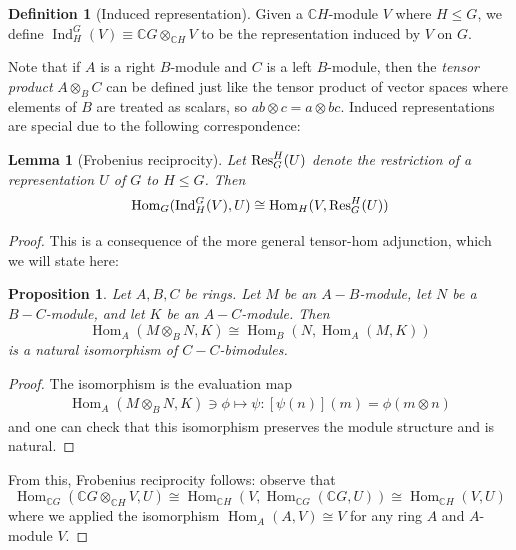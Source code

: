 \documentclass[11pt]{article}
\newtheorem{prop}{Proposition}
\newtheorem{lem}{Lemma}
\theoremstyle{definition}
\newtheorem{defn}{Definition}
\newcommand{\C}{\mathbb C}
\newcommand{\Ind}{\operatorname{Ind}}
\newcommand{\Hom}{\operatorname{Hom}}
\begin{document}
\begin{defn}[Induced representation]
    Given a $\C H$-module $V$ where $H \leq G$, we define $\Ind_H^G(V) \equiv \C
    G \otimes_{\C H} V$ to be the representation induced by $V$ on $G$.
\end{defn}

Note that if $A$ is a right $B$-module and $C$ is a left $B$-module, then the
\textit{tensor product} $A \otimes_B C$ can be defined just like the tensor
product of vector spaces where elements of $B$ are treated as scalars, so $ab
\otimes c = a \otimes bc$. Induced representations are special due to the
following correspondence:

\begin{lem}[Frobenius reciprocity]
  Let $\Res_G^H(U)$ denote the restriction of a representation $U$ of $G$ to $H
  \leq G$. Then
  \begin{align}
    \Hom_{G}(\Ind_H^G(V), U) \cong \Hom_H(V, \Res^H_G(U))
  \end{align}
\end{lem}
\begin{proof}
This is a consequence of the more general tensor-hom adjunction, which we will state here:

\begin{prop}
Let $A, B, C$ be rings. Let $M$ be an $A-B$-module, let $N$ be a $B-C$-module, and let $K$ be an $A-C$-module. Then
  \begin{equation}
    \Hom_A(M \otimes_B N, K) \cong \Hom_B(N, \Hom_A(M,K))
  \end{equation}
  is a natural isomorphism of $C-C$-bimodules.
\end{prop}

\begin{proof}
  The isomorphism is the evaluation map
  \begin{align}
    \Hom_A(M \otimes_B N, K) \ni \phi \mapsto \psi: [\psi(n)](m) = \phi(m \otimes n)
  \end{align}
  and one can check that this isomorphism preserves the module structure and is natural.
\end{proof}

From this, Frobenius reciprocity follows:
  observe that
\begin{equation}
\Hom_{\C G}(\C G \otimes_{\C H} V, U) \cong \Hom_{\C H}(V, \Hom_{\C G}(\C G, U)) \cong \Hom_{\C H}(V, U)
\end{equation}
where we applied the isomorphism $\Hom_{A}(A, V) \cong V$ for any ring $A$ and
$A$-module $V$.
\end{proof}
\end{document}
